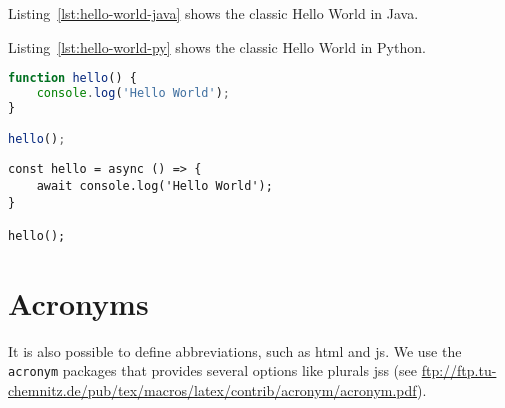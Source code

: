 Listing~\ref{lst:hello-world-java} shows the classic Hello World in Java.



Listing~\ref{lst:hello-world-py} shows the classic Hello World in Python.

\begin{lstlisting}[language=JavaScript, caption=Hello World in JavaScript, label=lst:hello-world-javascript]
function hello() {
    console.log('Hello World');
}

hello();
\end{lstlisting}

\newpage
\begin{lstlisting}[language=ES6, caption=Hello World in JavaScript (ES6), label=lst:hello-world-javascript]
const hello = async () => {
    await console.log('Hello World');
}

hello();
\end{lstlisting}

\section{Acronyms}
It is also possible to define abbreviations, such as \ac{html} and \ac{js}. We use the \texttt{acronym} packages that provides several options like plurals \acp{js} (see \url{ftp://ftp.tu-chemnitz.de/pub/tex/macros/latex/contrib/acronym/acronym.pdf}).
